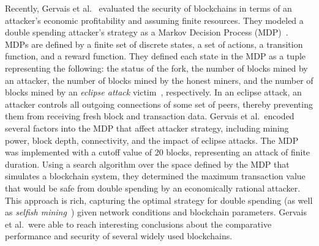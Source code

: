 
Recently, Gervais et al.~\cite{Gervais:2016} evaluated the security of blockchains in terms of an attacker's economic profitability and assuming finite resources. They modeled a double spending attacker's strategy  as a Markov Decision Process (MDP)~\cite{Bellman:1957}. MDPs are defined by a finite set of discrete states, a set of actions, a transition function, and a reward function. They defined each  state in the MDP as a tuple representing the following: the status of the fork, the number of blocks mined by an attacker,  the number of blocks mined by the honest miners, and  the number of blocks mined by an {\em eclipse attack} victim~\cite{Heilman:2015}, respectively. In an eclipse attack, an attacker controls all outgoing connections of some set of peers, thereby preventing them from receiving fresh block and transaction data. Gervais et al.\ encoded several factors into the MDP that affect  attacker strategy, including mining power, block depth, connectivity, and the impact of eclipse attacks. The MDP was implemented with a cutoff value of 20 blocks, representing an attack of finite duration. Using a search algorithm over the space defined by the MDP that simulates a blockchain system, they determined the maximum transaction value that would be safe from double spending by an economically rational attacker. This  approach is rich, capturing the optimal strategy for  double spending (as well as {\em selfish mining}~\cite{eyal:2014, sapirshtein:2015}) given  network conditions and blockchain parameters.  Gervais et al.\ were able to reach interesting conclusions about the comparative performance and security of several widely used blockchains.

